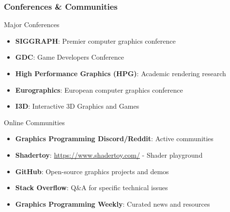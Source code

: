 \begin{frame}
\frametitle{Conferences \& Communities}

\begin{conceptbox}{Major Conferences}
\begin{itemize}
    \item \textbf{SIGGRAPH}: Premier computer graphics conference
    \item \textbf{GDC}: Game Developers Conference
    \item \textbf{High Performance Graphics (HPG)}: Academic rendering research
    \item \textbf{Eurographics}: European computer graphics conference
    \item \textbf{I3D}: Interactive 3D Graphics and Games
\end{itemize}
\end{conceptbox}

\begin{mathbox}{Online Communities}
\begin{itemize}
    \item \textbf{Graphics Programming Discord/Reddit}: Active communities
    \item \textbf{Shadertoy}: \url{https://www.shadertoy.com/} - Shader playground
    \item \textbf{GitHub}: Open-source graphics projects and demos
    \item \textbf{Stack Overflow}: Q\&A for specific technical issues
    \item \textbf{Graphics Programming Weekly}: Curated news and resources
\end{itemize}
\end{mathbox}

\end{frame}

